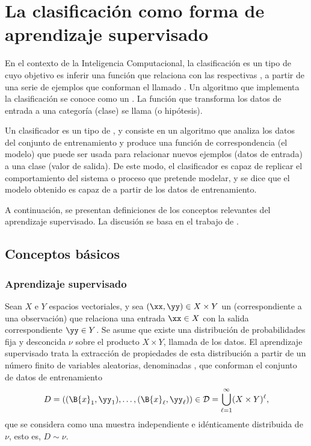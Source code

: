 %
%
%
\section{La clasificación como forma de aprendizaje supervisado}
%
En el contexto de la Inteligencia Computacional, la clasificación es
un tipo de  cuyo objetivo es
{inferir} una función que relaciona  con las
respectivas , a partir de una serie de ejemplos que
conforman el llamado . Un algoritmo que
implementa la clasificación se conoce como un .
La función que transforma los datos de entrada a una categoría
(clase) se llama  (o {hipótesis}).

Un clasificador es un tipo de , y consiste
en un algoritmo que analiza los datos del conjunto de entrenamiento
y produce una función de correspondencia (el modelo) que puede ser
usada para relacionar nuevos ejemplos (datos de entrada) a una clase
(valor de salida).
De este modo, el clasificador es capaz de replicar el comportamiento
del sistema o proceso que pretende modelar, y se dice que el modelo
obtenido es capaz de  a partir de los datos de
entrenamiento.

A continuación, se presentan definiciones de los conceptos
relevantes del aprendizaje supervisado. La discusión se
basa en el
trabajo de \citeauthor{glasmachers} \cite{glasmachers}.
%
%
\subsection{Conceptos básicos}
%
%
\subsubsection{Aprendizaje supervisado}
%
Sean $X$ e $Y$ espacios vectoriales, y sea $(\xx,\yy)\in{}X\times{}Y$
un  (correspondiente a una observación) que relaciona una
entrada $\xx\in{}X$ con la salida correspondiente $\yy\in{}Y$.
%
Se asume que existe una distribución de probabilidades fija y
desconcida $\nu$ sobre el producto $X\times Y$, llamada
 de los datos.  El aprendizaje supervisado
trata la extracción de propiedades de esta distribución a partir de un
número finito de variables aleatorias, denominadas , que
conforman el conjunto de datos de entrenamiento
%
\begin{align}
  D = \left((\B{x}_1,\yy_1),\ldots,(\B{x}_\ell,\yy_\ell)\right) \in
  \mathcal{D}=\bigcup_{\ell=1}^\infty (X\times Y)^\ell,
\end{align}
%
que se considera como una muestra independiente e idénticamente
distribuida de $\nu$, esto es, $D\sim\nu$.
%
